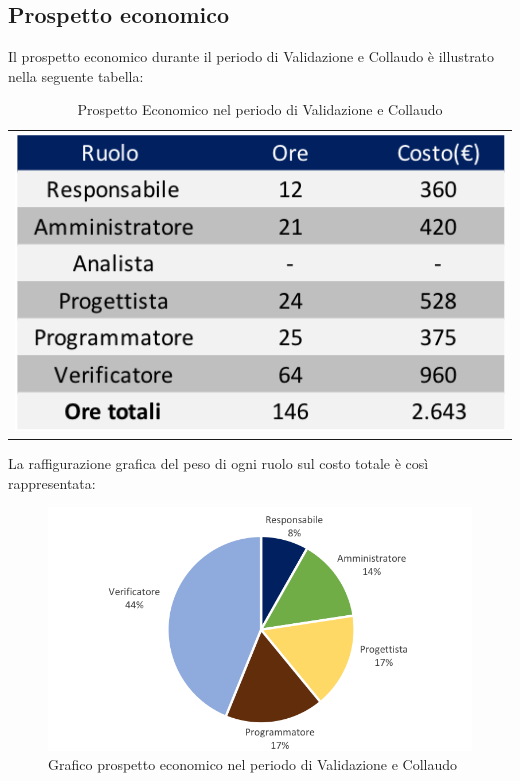 \subsection{Prospetto economico}
Il prospetto economico durante il periodo di Validazione e Collaudo è illustrato nella seguente tabella:

\begin{table}[!ht]
	\begin{center}
		\begin{tabular}{c}
			\includegraphics{images/tabellaValidazioneCollaudoEuro.png}
		\end{tabular}
		\caption{Prospetto Economico nel periodo di Validazione e Collaudo}
	\end{center}
\end{table}

La raffigurazione grafica del peso di ogni ruolo sul costo totale è così rappresentata:
\begin{figure}[!ht]
	\begin{center}
		\includegraphics{images/grafoValidazioneCollaudoEuro.png}
		\caption{Grafico prospetto economico nel periodo di Validazione e Collaudo}
	\end{center}
\end{figure}
\newpage
